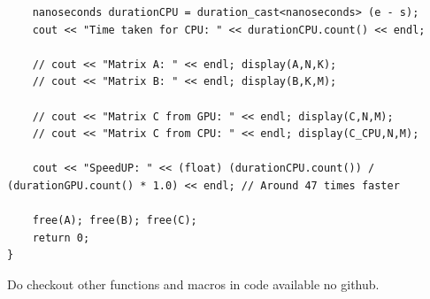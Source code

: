 \documentclass{article}
\begin{document}
\begin{lstlisting}
    nanoseconds durationCPU = duration_cast<nanoseconds> (e - s);
    cout << "Time taken for CPU: " << durationCPU.count() << endl;

    // cout << "Matrix A: " << endl; display(A,N,K);
    // cout << "Matrix B: " << endl; display(B,K,M);
    
    // cout << "Matrix C from GPU: " << endl; display(C,N,M);
    // cout << "Matrix C from CPU: " << endl; display(C_CPU,N,M);

    cout << "SpeedUP: " << (float) (durationCPU.count()) / (durationGPU.count() * 1.0) << endl; // Around 47 times faster

    free(A); free(B); free(C);
    return 0;
}
\end{lstlisting}
Do checkout other functions and macros in code available no github.
\end{document}
